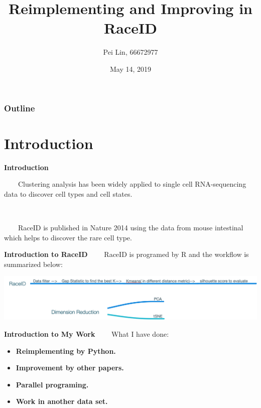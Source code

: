 \documentclass[12pt]{beamer}
\title[Reimplementing and Improving in RaceID]{Reimplementing and Improving in RaceID}
\author{Pei Lin, 66672977}
\institute[ShanghaiTech]{School of Information Science and Technology \\ShanghaiTech University}
\date{May 14, 2019}
\begin{document}
\begin{frame}
    \titlepage
\end{frame}

\begin{frame}
  \frametitle{Outline}
  \tableofcontents
\end{frame}





\section{Introduction}
\begin{frame}{\textbf{Introduction}}

\ \ \ \  Clustering analysis has been widely applied to single cell RNA-sequencing data to discover cell types and cell states.

\
\


\ \ \ \ RaceID is published in Nature 2014 using the data from mouse intestinal which helps to discover the rare cell type.  

\end{frame}




\begin{frame}{\textbf{Introduction to RaceID}}
\ \ \ \ RaceID is programed by R and the workflow is summarized below:

\centering
\includegraphics[scale=0.3]{fig2/workflow.png}

\end{frame}


\begin{frame}{\textbf{Introduction to My Work}}
\ \ \ \ What I have done:
\begin{itemize}
	\item \textbf{Reimplementing by Python.}
	\item \textbf{Improvement by other papers.}
	\item \textbf{Parallel programing.}
	\item \textbf{Work in another data set.}    
\end{itemize}

\end{frame}
\end{document}

